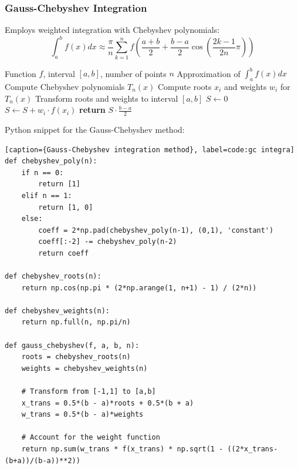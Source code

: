 \documentclass[10pt]{article}
\begin{document}
\subsubsection{Gauss-Chebyshev Integration}

Employs weighted integration with Chebyshev polynomials:
\begin{equation}
\int_{a}^{b} f(x)dx \approx \frac{\pi}{n}\sum_{k=1}^{n} f\left(\frac{a+b}{2} + \frac{b-a}{2}\cos\left(\frac{2k-1}{2n}\pi\right)\right)
\end{equation}


\begin{algorithm}[H]
\caption{Gauss-Chebyshev Integration}
\begin{algorithmic}[1]
\Require Function $f$, interval $[a, b]$, number of points $n$
\Ensure Approximation of $\int_{a}^{b} f(x) dx$
\State Compute Chebyshev polynomials $T_n(x)$
\State Compute roots $x_i$ and weights $w_i$ for $T_n(x)$
\State Transform roots and weights to interval $[a, b]$
\State $S \gets 0$
    \State $S \gets S + w_i \cdot f(x_i)$
\EndFor
\State \textbf{return} $S \cdot \frac{b-a}{2}$
\end{algorithmic}
\end{algorithm}

Python snippet for the Gauss-Chebyshev method:
\begin{lstlisting}[style=custompython][caption={Gauss-Chebyshev integration method}, label=code:gc integra]
def chebyshev_poly(n):
    if n == 0:
        return [1]
    elif n == 1:
        return [1, 0]
    else:
        coeff = 2*np.pad(chebyshev_poly(n-1), (0,1), 'constant')
        coeff[:-2] -= chebyshev_poly(n-2)
        return coeff

def chebyshev_roots(n):
    return np.cos(np.pi * (2*np.arange(1, n+1) - 1) / (2*n))

def chebyshev_weights(n):
    return np.full(n, np.pi/n)

def gauss_chebyshev(f, a, b, n):
    roots = chebyshev_roots(n)
    weights = chebyshev_weights(n)
    
    # Transform from [-1,1] to [a,b]
    x_trans = 0.5*(b - a)*roots + 0.5*(b + a)
    w_trans = 0.5*(b - a)*weights
    
    # Account for the weight function
    return np.sum(w_trans * f(x_trans) * np.sqrt(1 - ((2*x_trans-(b+a))/(b-a))**2))
    
\end{lstlisting}
\end{document}
